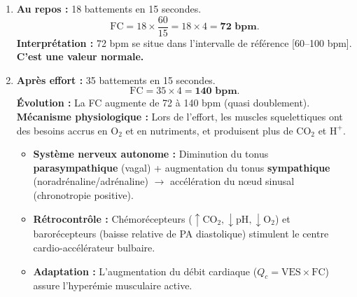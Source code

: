 \documentclass[11pt]{article}
\begin{document}
\begin{corrige}
\begin{enumerate}
    \item \textbf{Au repos :} 18 battements en 15 secondes.
    \[
    \text{FC} = 18 \times \frac{60}{15} = 18 \times 4 = \textbf{72 bpm}.
    \]
    \textbf{Interprétation :} 72 bpm se situe dans l'intervalle de référence [60--100 bpm]. \textbf{C'est une valeur normale.}
    \item \textbf{Après effort :} 35 battements en 15 secondes.
    \[
    \text{FC} = 35 \times 4 = \textbf{140 bpm}.
    \]
    \textbf{Évolution :} La FC augmente de 72 à 140 bpm (quasi doublement).
    \textbf{Mécanisme physiologique :} Lors de l'effort, les muscles squelettiques ont des besoins accrus en $\text{O}_2$ et en nutriments, et produisent plus de $\text{CO}_2$ et $\text{H}^+$.
    \begin{itemize}
        \item \textbf{Système nerveux autonome :} Diminution du tonus \textbf{parasympathique} (vagal) + augmentation du tonus \textbf{sympathique} (noradrénaline/adrénaline) $\to$ accélération du nœud sinusal (chronotropie positive).
        \item \textbf{Rétrocontrôle :} Chémorécepteurs ($\uparrow \text{CO}_2, \downarrow \text{pH}, \downarrow \text{O}_2$) et barorécepteurs (baisse relative de PA diastolique) stimulent le centre cardio-accélérateur bulbaire.
        \item \textbf{Adaptation :} L'augmentation du débit cardiaque ($Q_c = \text{VES} \times \text{FC}$) assure l'hyperémie musculaire active.
    \end{itemize}
\end{enumerate}
\end{corrige}
\end{document}
